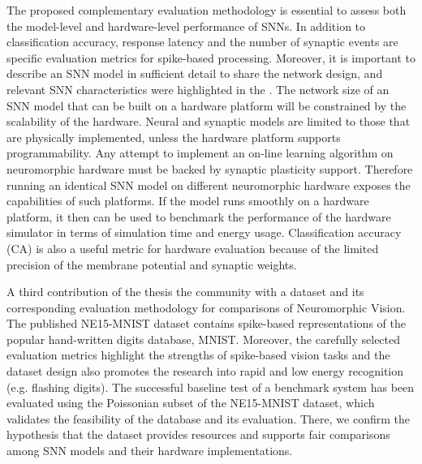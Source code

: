 The proposed complementary evaluation methodology is essential to assess both the model-level and hardware-level performance of SNNs.
In addition to classification accuracy, response latency and the number of synaptic events are specific evaluation metrics for spike-based processing.
Moreover, it is important to describe an SNN model in sufficient detail to share the network design, and relevant SNN characteristics were highlighted in the \DIFdelbegin {}\DIFdelend \DIFaddbegin {}\DIFaddend .  
The network size of an SNN model that can be built on a hardware platform will be constrained by the scalability of the hardware.
Neural and synaptic models are limited to those that are physically implemented, unless the hardware platform supports programmability.
Any attempt to implement an on-line learning algorithm on neuromorphic hardware must be backed by synaptic plasticity support.
Therefore running an identical SNN model on different neuromorphic hardware exposes the capabilities of such platforms.
If the model runs smoothly on a hardware platform, it then can be used to benchmark the performance of the hardware simulator in terms of simulation time and energy usage.
Classification accuracy (CA) is also a useful metric for hardware evaluation because of the limited precision of the membrane potential and synaptic weights.


A third contribution of the thesis \DIFdelbegin {}\DIFdelend \DIFaddbegin {}\DIFaddend the community with a dataset and its corresponding evaluation methodology for comparisons of Neuromorphic Vision.
The published NE15-MNIST dataset contains \DIFdelbegin {}\DIFdelend spike-based representations of the popular hand-written digits database, MNIST.
Moreover, the carefully selected evaluation metrics highlight the strengths of spike-based vision tasks and the dataset design also promotes the research into rapid and low energy recognition (e.g. flashing digits).
The successful baseline test of a benchmark system has been evaluated using the Poissonian subset of the NE15-MNIST dataset, which validates the feasibility of the database and its evaluation.
There, we confirm the hypothesis \DIFdelbegin {}\DIFdelend that the dataset provides resources and supports fair comparisons among SNN models and their hardware implementations.

